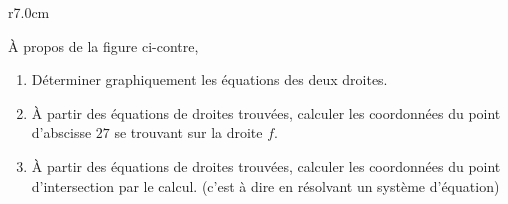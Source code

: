 
\begin{exercice}\label{exosmath-0229}

\begin{wrapfigure}{r}{7.0cm}
            \vspace{-3cm}        %
                \centering
                    
                \end{wrapfigure}

        À propos de la figure ci-contre, 
        \begin{enumerate}
            \item
                Déterminer graphiquement les équations des deux droites.
            \item
                À partir des équations de droites trouvées, calculer les coordonnées du point d'abscisse \( 27\) se trouvant sur la droite \( f\).
            \item
                À partir des équations de droites trouvées, calculer les coordonnées du point d'intersection par le calcul. (c'est à dire en résolvant un système d'équation)
        \end{enumerate}

\end{exercice}
